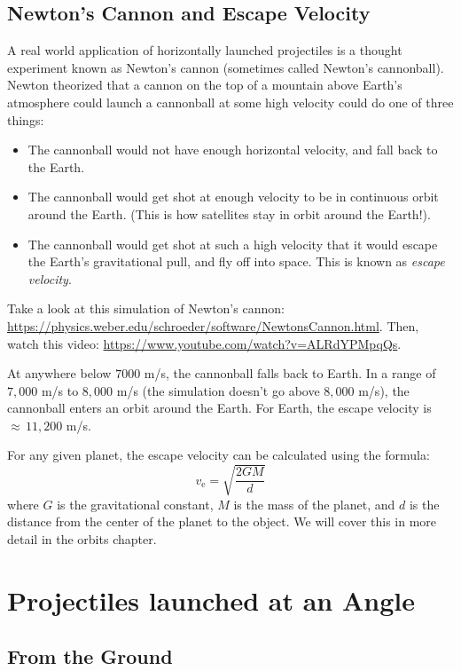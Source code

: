 \subsection{Newton's Cannon and Escape Velocity}
A real world application of horizontally launched projectiles is a thought experiment known as Newton's cannon (sometimes called Newton's cannonball). Newton theorized that a cannon on the top of a mountain above Earth's atmosphere could launch a cannonball at some high velocity could do one of three things:
\begin{itemize}
    \item The cannonball would not have enough horizontal velocity, and fall back to the Earth. 
    \item The cannonball would get shot at enough velocity to be in continuous orbit around the Earth. (This is how satellites stay in orbit around the Earth!).
    \item The cannonball would get shot at such a high velocity that it would escape the Earth's gravitational pull, and fly off into space. This is known as \emph{escape velocity}. 
\end{itemize}

Take a look at this simulation of Newton's cannon: \url{https://physics.weber.edu/schroeder/software/NewtonsCannon.html}. Then, watch this video: \url{https://www.youtube.com/watch?v=ALRdYPMpqQs}.

At anywhere below $7000$ m/s, the cannonball falls back to Earth. In a range of $7,000$ m/s to $8,000$ m/s (the simulation doesn't go above $8,000$ m/s), the cannonball enters an orbit around the Earth. For Earth, the escape velocity is $\approx \,11,200$ m/s.

For any given planet, the escape velocity can be calculated using the formula:
$${\displaystyle v_{\text{e}}={\sqrt {\frac {2GM}{d}}}}$$
where $G$ is the gravitational constant, $M$ is the mass of the planet, and $d$ is the distance from the center of the planet to the object. We will cover this in more detail in the orbits chapter.

\section{Projectiles launched at an Angle}
\subsection{From the Ground}

